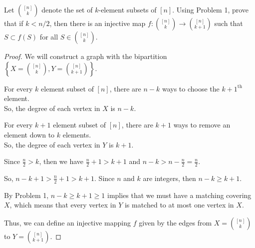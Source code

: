 \documentclass[../hw6]{subfiles}
\begin{document}
\begin{problem}
Let $\binom{[n]}{k}$ denote the set of $k$-element subsets of $[n]$. Using Problem 1, prove that if $k < n/2$, then there is an injective map $f : \binom{[n]}{k} \to \binom{[n]}{k+1}$ such that $S \subset f(S)$ for all $S \in \binom{[n]}{k}$.
\end{problem}
\begin{proof}
	We will construct a graph with the bipartition $\left\{X = \binom{[n]}{k} ,Y =\binom{[n]}{k+1} \right\}$.

	For every $k$ element subset of $[n]$, there are  $n-k$ ways to choose the  ${k+1}^{\text{th}}$ element. \\
	So, the degree of each vertex in $X$ is $n-k$.

	For every $k+1$ element subset of $[n]$, there are  $k+1$ ways to remove an element down to  $k$ elements. \\
	So, the degree of each vertex in $Y$ is $k+1$.

	Since $\frac{n}{2}>k$, then we have  $\frac{n}{2}+1>k+1$ and $n-k>n-\frac{n}{2} = \frac{n}{2}$.

	So, $n-k+1>\frac{n}{2}+1>k+1$.
	Since $n$ and  $k$ are integers, then  $n-k \ge k+1$.

	By Problem 1, $n-k\ge k+1\ge 1$ implies that we must have a matching covering $X$,
	which means that every vertex in $Y$ is matched to at most one vertex in  $X$.

	Thus, we can define an injective mapping $f$ given by the edges from $X=\binom{[n]}{k}$ to $Y=\binom{[n]}{k+1}$.


\end{proof}
\end{document}
